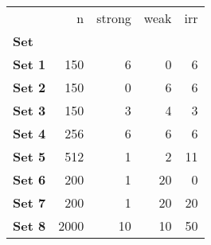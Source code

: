 \begin{tabular}{lrrrr}
\toprule
{} &     n &  strong &  weak &  irr \\
\textbf{Set  } &       &         &       &      \\
\midrule
\textbf{Set 1} &   150 &       6 &     0 &    6 \\
\textbf{Set 2} &   150 &       0 &     6 &    6 \\
\textbf{Set 3} &   150 &       3 &     4 &    3 \\
\textbf{Set 4} &   256 &       6 &     6 &    6 \\
\textbf{Set 5} &   512 &       1 &     2 &   11 \\
\textbf{Set 6} &   200 &       1 &    20 &    0 \\
\textbf{Set 7} &   200 &       1 &    20 &   20 \\
\textbf{Set 8} &  2000 &      10 &    10 &   50 \\
\bottomrule
\end{tabular}
